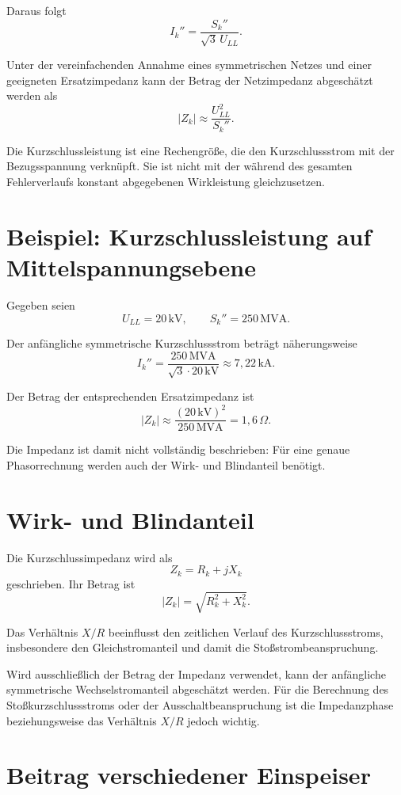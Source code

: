 Daraus folgt
\[
  I_k''=\frac{S_k''}{\sqrt{3}\,U_{LL}}.
\]

Unter der vereinfachenden Annahme eines symmetrischen Netzes und einer
geeigneten Ersatzimpedanz kann der Betrag der Netzimpedanz abgeschätzt
werden als
\[
  |Z_k|\approx\frac{U_{LL}^2}{S_k''}.
\]

Die Kurzschlussleistung ist eine Rechengröße, die den Kurzschlussstrom
mit der Bezugsspannung verknüpft. Sie ist nicht mit der während des
gesamten Fehlerverlaufs konstant abgegebenen Wirkleistung gleichzusetzen.

\section{Beispiel: Kurzschlussleistung auf Mittelspannungsebene}

Gegeben seien
\[
  U_{LL}=20\,\mathrm{kV},\qquad S_k''=250\,\mathrm{MVA}.
\]

Der anfängliche symmetrische Kurzschlussstrom beträgt näherungsweise
\[
  I_k''=\frac{250\,\mathrm{MVA}}
  {\sqrt{3}\cdot20\,\mathrm{kV}}
  \approx7{,}22\,\mathrm{kA}.
\]

Der Betrag der entsprechenden Ersatzimpedanz ist
\[
  |Z_k|\approx\frac{(20\,\mathrm{kV})^2}{250\,\mathrm{MVA}}
  =1{,}6\,\Omega.
\]

Die Impedanz ist damit nicht vollständig beschrieben: Für eine genaue
Phasorrechnung werden auch der Wirk- und Blindanteil benötigt.

\section{Wirk- und Blindanteil}

Die Kurzschlussimpedanz wird als
\[
  Z_k=R_k+jX_k
\]
geschrieben. Ihr Betrag ist
\[
  |Z_k|=\sqrt{R_k^2+X_k^2}.
\]

Das Verhältnis \(X/R\) beeinflusst den zeitlichen Verlauf des Kurzschlussstroms,
insbesondere den Gleichstromanteil und damit die Stoßstrombeanspruchung.

Wird ausschließlich der Betrag der Impedanz verwendet, kann der anfängliche
symmetrische Wechselstromanteil abgeschätzt werden. Für die Berechnung
des Stoßkurzschlussstroms oder der Ausschaltbeanspruchung ist die
Impedanzphase beziehungsweise das Verhältnis \(X/R\) jedoch wichtig.

\section{Beitrag verschiedener Einspeiser}

